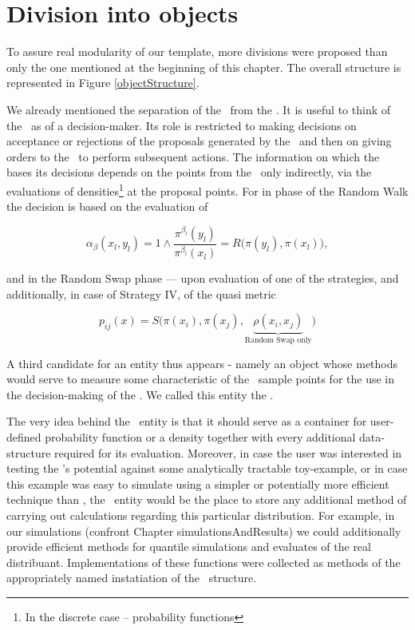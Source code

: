 \section{Division into objects}

To assure real modularity of our template, more divisions were proposed than only the one mentioned at the beginning of this chapter. The overall structure is represented in Figure \ref{objectStructure}.

We already mentioned the separation of the \algo\, from the \sspace. It is useful to think of the \algo\, as of a decision-maker. Its role is restricted to making decisions on acceptance or rejections of the proposals generated by the \sspace\, and then on giving orders to the \sspace\, to perform subsequent actions. The information on which the \algo\, bases its decisions depends on the points from the \sspace\, only indirectly, via the evaluations of densities\footnote{In the discrete case -- probability functions} at the proposal points. For in phase of the Random Walk the decision is based on the evaluation of 

\begin{equation*}
	\alpha_\beta(x_l , y_l) = 1 \wedge \frac{\pi^{\beta_l}(y_l)}{\pi^{\beta_l}(x_l)} = R\Big(\pi(y_l),\pi(x_l)\Big),
\end{equation*}

and in the Random Swap phase --- upon evaluation of one of the strategies, and additionally, in case of Strategy IV, of the quasi metric	

\begin{equation*}
	p_{ij}(x) = S\Big(\pi(x_i),\pi(x_j), \underbrace{\rho(x_i, x_j)}_\text{Random Swap only}\Big)
\end{equation*}

 A third candidate for an entity thus appears - namely an object whose methods would serve to measure some characteristic of the \sspace\, sample points for the use in the decision-making of the \algo. We called this entity the \measure. 

The very idea behind the \measure\, entity is that it should serve as a container for user-defined probability function or a density together with every additional data-structure required for its evaluation. Moreover, in case the user was interested in testing the \PTalgo's potential against some analytically tractable toy-example, or in case this example was easy to simulate using a simpler or potentially more efficient technique than \mcmc, the \measure\,
 entity would be the place to store any additional method of carrying out calculations regarding this particular distribution. For example, in our simulations (confront Chapter simulationsAndResults) we could  additionally provide efficient methods for quantile simulations and evaluates of the real distribuant. Implementations of these functions were collected as methods of the appropriately named instatiation of the \measure\, structure.  



